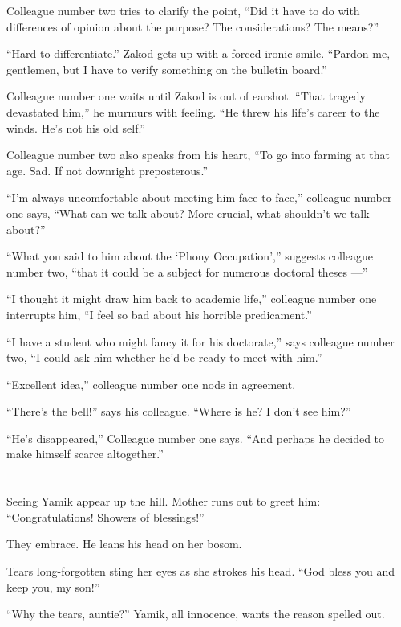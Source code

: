 \documentclass[twoside,11pt,openany]{book}
\begin{document}
Colleague number two tries to clarify the point, ``Did it have to do with differences of opinion about the
purpose? The considerations? The means?''

``Hard to differentiate.'' Zakod gets up with a forced ironic smile. ``Pardon me,
gentlemen, but I have to verify something on the bulletin board.''

Colleague number one waits until Zakod is out of earshot. ``That tragedy devastated him,'' he
murmurs with feeling. ``He threw his life's career to the winds.  He's not his old self.''

Colleague number two also speaks from his heart, ``To go into farming at that age. Sad. If not downright
preposterous.''

``I'm always uncomfortable about meeting him face to face,'' colleague number one says, ``What can we talk about? More
crucial, what shouldn't we talk about?''

``What you said to him about the `Phony Occupation',{}'' suggests colleague number two, ``that it could be
a subject for numerous doctoral theses ---''

``I thought it might draw him back to academic life,'' colleague number one interrupts him, ``I feel so bad
about his horrible predicament.''

``I have a student who might fancy it for his doctorate,'' says colleague number two, ``I could ask him
whether he'd be ready to meet with him.''

``Excellent idea,'' colleague number one nods in agreement.

``There's the bell!'' says his colleague. ``Where is he? I don't see him?''

``He's disappeared,'' Colleague number one says. ``And perhaps he decided to make himself
scarce altogether.''


\bigskip

\chapter{}

Seeing Yamik appear up the hill. Mother runs out to greet him: ``Congratulations! Showers of
blessings!''

They embrace. He leans his head on her bosom.

Tears long-forgotten sting her eyes as she strokes his head.  ``God bless you and keep you, my son!''

``Why the tears, auntie?'' Yamik, all innocence, wants the reason spelled out.
\end{document}
